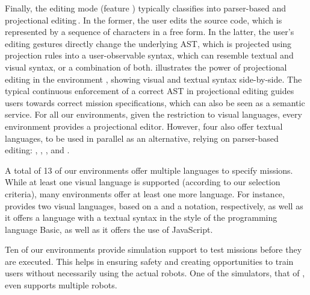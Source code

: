 Finally, the editing mode (feature \feditingmode) typically classifies into parser-based and projectional editing\,\cite{voelter2014projectional,berger2016pe}. In the former, the user edits the source code, which is represented by a sequence of characters in a free form. In the latter, the user's editing gestures directly change the underlying AST, which is projected using projection rules into a user-observable syntax, which can resemble textual and visual syntax, or a combination of both.  illustrates the power of projectional editing in the environment \easyc, showing visual and textual syntax side-by-side. The typical continuous enforcement of a correct AST in projectional editing guides users towards correct mission specifications, which can also be seen as a semantic service. For all our environments, given the restriction to visual languages, every environment provides a projectional editor. However, four also offer textual languages, to be used in parallel as an alternative, relying on parser-based editing: \aseba, \vex, \turtlebot, and \robotc{}.

 A total of 13 of our environments offer multiple languages to specify missions. While at least one visual language is supported (according to our selection criteria), many environments offer at least one more language. For instance, \picaxe provides two visual languages, based on a \fflowchart and a \fblockly notation, respectively, as well as it offers a language with a textual syntax in the style of the programming language Basic, as well as it offers the use of JavaScript.



 Ten of our environments provide simulation support to test missions before they are executed. This helps in ensuring safety and creating opportunities to train users without necessarily using the actual robots. One of the simulators, that of \missionlab, even supports multiple robots.

